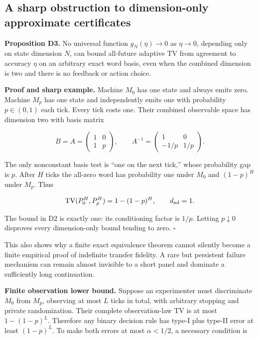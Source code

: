 \documentclass[
  11pt,
  a4paper,
]{article}
\begin{document}
\subsection{A sharp obstruction to dimension-only approximate
certificates}\label{a-sharp-obstruction-to-dimension-only-approximate-certificates}

\textbf{Proposition D3.} No universal function \(g_N(\eta)\to0\) as
\(\eta\to0\), depending only on state dimension \(N\), can bound
all-future adaptive TV from agreement to accuracy \(\eta\) on an
arbitrary exact word basis, even when the combined dimension is two and
there is no feedback or action choice.

\textbf{Proof and sharp example.} Machine \(M_0\) has one state and
always emits zero. Machine \(M_p\) has one state and independently emits
one with probability \(p\in(0,1)\) each tick. Every tick costs one.
Their combined observable space has dimension two with basis matrix

\[
B=A=\begin{pmatrix}1&0\\1&p\end{pmatrix},
\qquad
A^{-1}=\begin{pmatrix}1&0\\-1/p&1/p\end{pmatrix}.
\]

The only nonconstant basis test is ``one on the next tick,'' whose
probability gap is \(p\). After \(H\) ticks the all-zero word has
probability one under \(M_0\) and \((1-p)^H\) under \(M_p\). Thus

\[
\operatorname{TV}(P_0^{H},P_p^{H})=1-(1-p)^H,
\qquad d_{\rm ad}=1.
\]

The bound in D2 is exactly one: its conditioning factor is \(1/p\).
Letting \(p\downarrow0\) disproves every dimension-only bound tending to
zero. \(\square\)

This also shows why a finite exact equivalence theorem cannot silently
become a finite empirical proof of indefinite transfer fidelity. A rare
but persistent failure mechanism can remain almost invisible to a short
panel and dominate a sufficiently long continuation.

\textbf{Finite observation lower bound.} Suppose an experimenter must
discriminate \(M_0\) from \(M_p\), observing at most \(L\) ticks in
total, with arbitrary stopping and private randomization. Their complete
observation-law TV is at most \(1-(1-p)^L\). Therefore any binary
decision rule has type-I plus type-II error at least \((1-p)^L\). To
make both errors at most \(\alpha<1/2\), a necessary condition is
\end{document}
